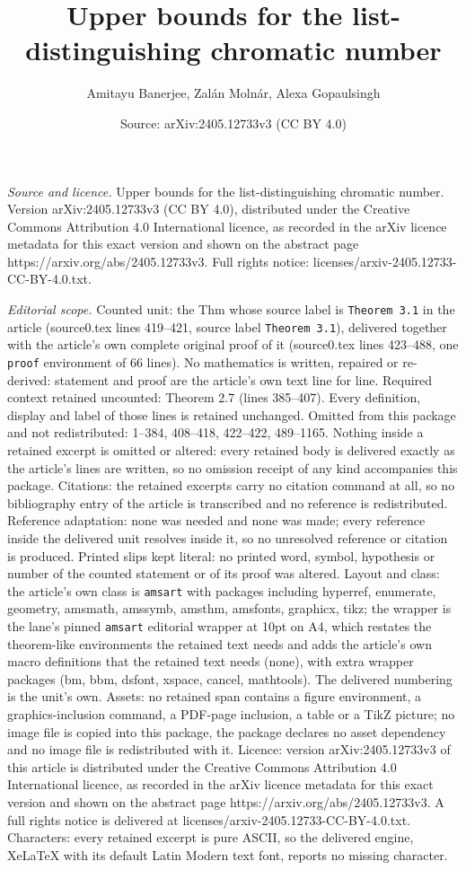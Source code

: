 \documentclass[10pt,a4paper]{amsart}
\title[Upper bounds for the list-distinguishing chromatic number]{Upper bounds for the list-distinguishing chromatic number}
\author{Amitayu Banerjee, Zal\'an Moln\'ar, Alexa Gopaulsingh}
\date{Source: arXiv:2405.12733v3 (CC BY 4.0)}
\begin{document}
\maketitle

\noindent\emph{Source and licence.} Upper bounds for the list-distinguishing chromatic number. Version arXiv:2405.12733v3 (CC BY 4.0), distributed under the Creative Commons Attribution 4.0 International licence, as recorded in the arXiv licence metadata for this exact version and shown on the abstract page https://arxiv.org/abs/2405.12733v3. Full rights notice: licenses/arxiv-2405.12733-CC-BY-4.0.txt.\par\smallskip

\noindent\textit{Editorial scope.} Counted unit: the Thm whose source label is \texttt{Theorem 3.1} in the article (source0.tex lines 419--421, source label \texttt{Theorem 3.1}), delivered together with the article's own complete original proof of it (source0.tex lines 423--488, one \texttt{proof} environment of 66 lines). No mathematics is written, repaired or re-derived: statement and proof are the article's own text line for line. Required context retained uncounted: Theorem 2.7 (lines 385--407). Every definition, display and label of those lines is retained unchanged. Omitted from this package and not redistributed: 1--384, 408--418, 422--422, 489--1165. Nothing inside a retained excerpt is omitted or altered: every retained body is delivered exactly as the article's lines are written, so no omission receipt of any kind accompanies this package. Citations: the retained excerpts carry no citation command at all, so no bibliography entry of the article is transcribed and no reference is redistributed. Reference adaptation: none was needed and none was made; every reference inside the delivered unit resolves inside it, so no unresolved reference or citation is produced. Printed slips kept literal: no printed word, symbol, hypothesis or number of the counted statement or of its proof was altered. Layout and class: the article's own class is \texttt{amsart} with packages including hyperref, enumerate, geometry, amsmath, amssymb, amsthm, amsfonts, graphicx, tikz; the wrapper is the lane's pinned \texttt{amsart} editorial wrapper at 10pt on A4, which restates the theorem-like environments the retained text needs and adds the article's own macro definitions that the retained text needs (none), with extra wrapper packages (bm, bbm, dsfont, xspace, cancel, mathtools). The delivered numbering is the unit's own. Assets: no retained span contains a figure environment, a graphics-inclusion command, a PDF-page inclusion, a table or a TikZ picture; no image file is copied into this package, the package declares no asset dependency and no image file is redistributed with it. Licence: version arXiv:2405.12733v3 of this article is distributed under the Creative Commons Attribution 4.0 International licence, as recorded in the arXiv licence metadata for this exact version and shown on the abstract page https://arxiv.org/abs/2405.12733v3. A full rights notice is delivered at licenses/arxiv-2405.12733-CC-BY-4.0.txt. Characters: every retained excerpt is pure ASCII, so the delivered engine, XeLaTeX with its default Latin Modern text font, reports no missing character.
\end{document}
